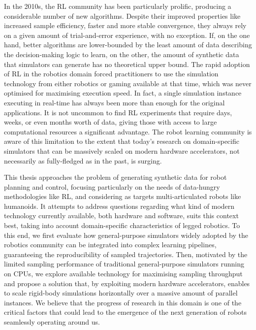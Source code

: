 In the 2010s, the \ac{RL} community has been particularly prolific, producing a considerable number of new algorithms.
Despite their improved properties like increased sample efficiency, faster and more stable convergence, \etc they always rely on a given amount of trial-and-error experience, with no exception.
If, on the one hand, better algorithms are lower-bounded by the least amount of data describing the decision-making logic to learn, on the other, the amount of synthetic data that simulators can generate has no theoretical upper bound.
The rapid adoption of \ac{RL} in the robotics domain forced practitioners to use the simulation technology from either robotics or gaming available at that time, which was never optimised for maximising execution speed.
In fact, a single simulation instance executing in real-time has always been more than enough for the original applications.
It is not uncommon to find \ac{RL} experiments that require days, weeks, or even months worth of data, giving those with access to large computational resources a significant advantage.
The robot learning community is aware of this limitation to the extent that today's research on domain-specific simulators that can be massively scaled on modern hardware accelerators, not necessarily as fully-fledged as in the past, is surging.

\vspace{3mm}
This thesis approaches the problem of generating synthetic data for robot planning and control, focusing particularly on the needs of data-hungry methodologies like \ac{RL}, and considering as targets multi-articulated robots like humanoids.
It attempts to address questions regarding what kind of modern technology currently available, both hardware and software, suits this context best, taking into account domain-specific characteristics of legged robotics.
To this end, we first evaluate how general-purpose simulators widely adopted by the robotics community can be integrated into complex learning pipelines, guaranteeing the reproducibility of sampled trajectories.
Then, motivated by the limited sampling performance of traditional general-purpose simulators running on \acp{CPU}, we explore available technology for maximising sampling throughput and propose a solution that, by exploiting modern hardware accelerators, enables to scale rigid-body simulations horizontally over a massive amount of parallel instances.
We believe that the progress of research in this domain is one of the critical factors that could lead to the emergence of the next generation of robots seamlessly operating around us.

